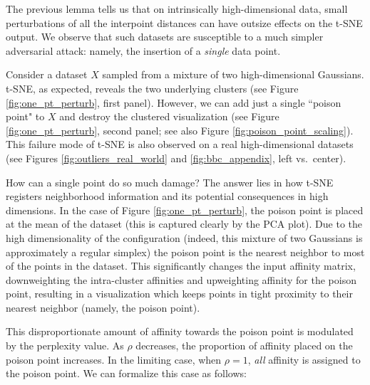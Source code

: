 The previous lemma tells us that on intrinsically high-dimensional data, small perturbations of all the interpoint distances can have outsize effects on the t-SNE output. We observe that such datasets are susceptible to a much simpler adversarial attack: namely, the insertion of a \textit{single} data point. 

Consider a dataset $X$ sampled from a mixture of two high-dimensional Gaussians. t-SNE, as expected, reveals the two underlying clusters (see Figure \ref{fig:one_pt_perturb}, first panel). However, we can add just a single ``poison point" to $X$ and destroy the clustered visualization (see Figure \ref{fig:one_pt_perturb}, second panel; see also Figure \ref{fig:poison_point_scaling}). This failure mode of t-SNE is also observed on a real high-dimensional datasets (see Figures \ref{fig:outliers_real_world} and \ref{fig:bbc_appendix}, left vs.\ center). %

How can a single point do so much damage? The answer lies in how t-SNE registers neighborhood information and its potential consequences in high dimensions. In the case of Figure \ref{fig:one_pt_perturb}, the poison point is placed at the mean of the dataset (this is captured clearly by the PCA plot). Due to the high dimensionality of the configuration (indeed, this mixture of two Gaussians is approximately a regular simplex) the poison point is the nearest neighbor to most of the points in the dataset. This significantly changes the input affinity matrix, downweighting the intra-cluster affinities and upweighting affinity for the poison point, resulting in a visualization which keeps points in tight proximity to their nearest neighbor (namely, the poison point). %

This disproportionate amount of affinity towards the poison point is modulated by the perplexity value. As \(\rho\) decreases, the proportion of affinity placed on the poison point increases. In the limiting case, when \(\rho = 1\), \textit{all} affinity is assigned to the poison point. We can formalize this case as follows: 




